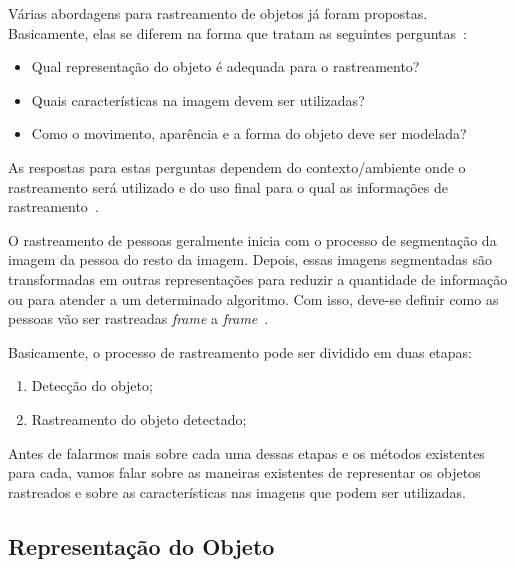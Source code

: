 	Várias abordagens para rastreamento de objetos já foram propostas. Basicamente, elas se diferem na forma que tratam as seguintes perguntas~\cite{yilmaz}: 
		
		\begin{itemize}
			\item Qual representação do objeto é adequada para o rastreamento?
			\item Quais características na imagem devem ser utilizadas?
			\item Como o movimento, aparência e a forma do objeto deve ser modelada? 
		\end{itemize}

	As respostas para estas perguntas dependem do contexto/ambiente onde o rastreamento será utilizado e do uso final para o qual as informações de rastreamento~\cite{yilmaz}.

	O rastreamento de pessoas geralmente inicia com o processo de segmentação da imagem da pessoa do resto da imagem. Depois, essas imagens segmentadas são transformadas em outras representações para reduzir a quantidade de informação ou para atender a um determinado algoritmo. Com isso, deve-se definir como as pessoas vão ser rastreadas \textit{frame} a \textit{frame}~\cite{moeslund}.

	Basicamente, o processo de rastreamento pode ser dividido em duas etapas:

		\begin{enumerate}
			\item Detecção do objeto;
			\item Rastreamento do objeto detectado;
		\end{enumerate}

	Antes de falarmos mais sobre cada uma dessas etapas e os métodos existentes para cada, vamos falar sobre as maneiras existentes de representar os objetos rastreados e sobre as características nas imagens que podem ser utilizadas.


\subsection{Representação do Objeto}

